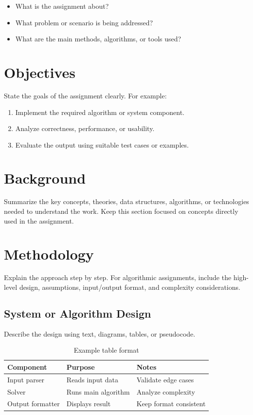 \documentclass[12pt,a4paper]{article}
\begin{document}
\begin{itemize}
  \item What is the assignment about?
  \item What problem or scenario is being addressed?
  \item What are the main methods, algorithms, or tools used?
\end{itemize}

\section{Objectives}

State the goals of the assignment clearly. For example:

\begin{enumerate}
  \item Implement the required algorithm or system component.
  \item Analyze correctness, performance, or usability.
  \item Evaluate the output using suitable test cases or examples.
\end{enumerate}

\section{Background}

Summarize the key concepts, theories, data structures, algorithms, or technologies needed to understand the work. Keep this section focused on concepts directly used in the assignment.

\section{Methodology}

Explain the approach step by step. For algorithmic assignments, include the high-level design, assumptions, input/output format, and complexity considerations.

\subsection{System or Algorithm Design}

Describe the design using text, diagrams, tables, or pseudocode.

\begin{table}[htbp]
  \centering
  \caption{Example table format}
  \label{tab:component-summary}
  \begin{tabular}{lll}
    \toprule
    Component & Purpose & Notes \\
    \midrule
    Input parser & Reads input data & Validate edge cases \\
    Solver & Runs main algorithm & Analyze complexity \\
    Output formatter & Displays result & Keep format consistent \\
    \bottomrule
  \end{tabular}
\end{table}
\end{document}
